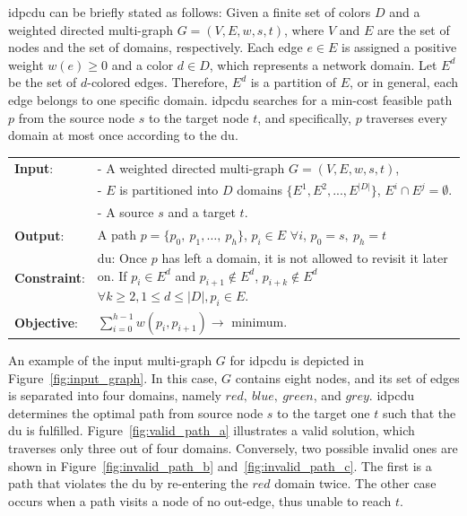\gls{idpcdu} can be briefly stated as follows: Given a finite set of colors $D$ and a weighted directed multi-graph $G=(V, E, w, s, t)$, where $V$ and $E$ are the set of nodes and the set of domains, respectively. Each edge $e \in E$ is assigned a positive weight $w(e) \geq 0$ and a color $d \in D$, which represents a network domain. Let $E^d$ be the set of $d$-colored edges. Therefore, $E^d$ is a partition of $E$, or in general, each edge belongs to one specific domain. \gls{idpcdu} searches for a min-cost feasible path $p$ from the source node $s$ to the target node $t$, and specifically, $p$ traverses every domain at most once according to the \gls{du}.
\bigskip
\begin{center}
	\begin{tabular}{lp{10cm}}
		\hline 
		\textbf{Input}:	&- A weighted directed multi-graph 
		$G = (V, E, w, s, t)$,\\
		&- $E$ is partitioned into $D$ domains $\{E^1, E^2, . . ., E^{|D|}\}$, $E^i \cap E^j = \emptyset$.\\
		&  - A source $s$ and a target $t$.\\
		\hline
		\textbf{Output}: &  A path $p = \{p_0,~p_1,\dots,~p_h\}$, $p_i \in E$ $\forall i$, $p_0 = s,~p_h = t$\\
		\hline 
		\textbf{Constraint}: & \gls{du}: Once $p$ has left a domain, it is not allowed to revisit it later on. If $p_{i} \in E^d$ and $p_{i+1} \notin E^d$, $p_{i+k} \notin E^d$  $\forall k\geq2, 1\le d \le |D|, p_i \in E$. \\
		\hline 
		\textbf{Objective}: & $\displaystyle \sum_{i =0 }^{h-1} w(p_i,p_{i+1}) \rightarrow $ minimum.\\
		\hline 
	\end{tabular}
\end{center}
\bigskip
An example of the input multi-graph $G$ for \gls{idpcdu} is depicted in Figure~\ref{fig:input_graph}. In this case, $G$ contains eight nodes, and its set of edges is separated into four domains, namely $red,~blue,~green$, and $grey$. \gls{idpcdu} determines the optimal path from source node $s$ to the target one $t$ such that the \gls{du} is fulfilled. Figure~\ref{fig:valid_path_a} illustrates a valid solution, which traverses only three out of four domains. Conversely, two possible invalid ones are shown in Figure~\ref{fig:invalid_path_b} and~\ref{fig:invalid_path_c}. The first is a path that violates the \gls{du} by re-entering the $red$ domain twice. The other case occurs when a path visits a node of no out-edge, thus unable to reach $t$.
